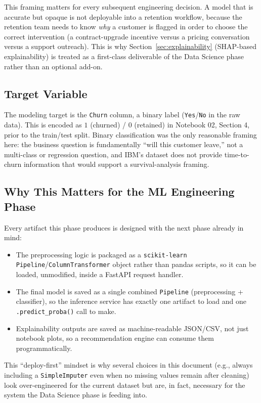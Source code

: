 \documentclass[11pt]{article}
\newcommand{\artifact}[1]{\texttt{\color{navy}#1}}
\begin{document}
This framing matters for every subsequent engineering decision. A model that is accurate but opaque is not deployable into a retention workflow, because the retention team needs to know \emph{why} a customer is flagged in order to choose the correct intervention (a contract-upgrade incentive versus a pricing conversation versus a support outreach). This is why Section~\ref{sec:explainability} (SHAP-based explainability) is treated as a first-class deliverable of the Data Science phase rather than an optional add-on.

\subsection{Target Variable}

The modeling target is the \artifact{Churn} column, a binary label (\texttt{Yes}/\texttt{No} in the raw data). This is encoded as $1$ (churned) / $0$ (retained) in Notebook 02, Section 4, prior to the train/test split. Binary classification was the only reasonable framing here: the business question is fundamentally ``will this customer leave,'' not a multi-class or regression question, and IBM's dataset does not provide time-to-churn information that would support a survival-analysis framing.

\subsection{Why This Matters for the ML Engineering Phase}

Every artifact this phase produces is designed with the next phase already in mind:
\begin{itemize}[leftmargin=1.4em]
    \item The preprocessing logic is packaged as a \texttt{scikit-learn} \texttt{Pipeline}/\texttt{ColumnTransformer} object rather than pandas scripts, so it can be loaded, unmodified, inside a FastAPI request handler.
    \item The final model is saved as a single combined \texttt{Pipeline} (preprocessing + classifier), so the inference service has exactly one artifact to load and one \texttt{.predict\_proba()} call to make.
    \item Explainability outputs are saved as machine-readable JSON/CSV, not just notebook plots, so a recommendation engine can consume them programmatically.
\end{itemize}

This ``deploy-first'' mindset is why several choices in this document (e.g., always including a \texttt{SimpleImputer} even when no missing values remain after cleaning) look over-engineered for the current dataset but are, in fact, necessary for the system the Data Science phase is feeding into.
\end{document}
